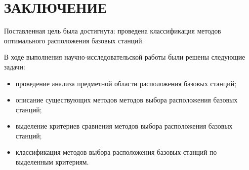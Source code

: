 \chapter*{\hfill ЗАКЛЮЧЕНИЕ \hfill}

Поставленная цель была достигнута: проведена классификация методов оптимального расположения базовых станций.

В ходе выполнения научно-исследовательской работы были решены следующие задачи:

\begin{itemize}[label=---]
	\item проведение анализа предметной области расположения базовых станций;
	\item описание существующих методов методов выбора расположения базовых станций;
	\item выделение критериев сравнения методов  выбора расположения базовых станций;
	\item классификация методов выбора расположения базовых станций по выделенным критериям.
\end{itemize}

